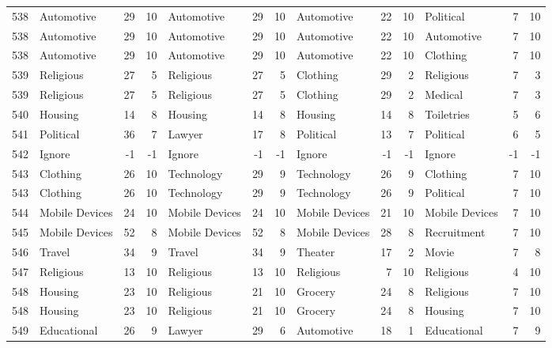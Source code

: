 \begin{figure}[htbp]
\begin{tabular}{rlrrlrrlrrlrr}
    538   & Automotive & 29    & 10    & Automotive & 29    & 10    & Automotive & 22    & 10    & Political & 7     & 10 \\
    538   & Automotive & 29    & 10    & Automotive & 29    & 10    & Automotive & 22    & 10    & Automotive & 7     & 10 \\
    538   & Automotive & 29    & 10    & Automotive & 29    & 10    & Automotive & 22    & 10    & Clothing & 7     & 10 \\
    539   & Religious & 27    & 5     & Religious & 27    & 5     & Clothing & 29    & 2     & Religious & 7     & 3 \\
    539   & Religious & 27    & 5     & Religious & 27    & 5     & Clothing & 29    & 2     & Medical & 7     & 3 \\
    540   & Housing & 14    & 8     & Housing & 14    & 8     & Housing & 14    & 8     & Toiletries & 5     & 6 \\
    541   & Political & 36    & 7     & Lawyer & 17    & 8     & Political & 13    & 7     & Political & 6     & 5 \\
    542   & Ignore & -1    & -1    & Ignore & -1    & -1    & Ignore & -1    & -1    & Ignore & -1    & -1 \\
    543   & Clothing & 26    & 10    & Technology & 29    & 9     & Technology & 26    & 9     & Clothing & 7     & 10 \\
    543   & Clothing & 26    & 10    & Technology & 29    & 9     & Technology & 26    & 9     & Political & 7     & 10 \\
    544   & Mobile Devices & 24    & 10    & Mobile Devices & 24    & 10    & Mobile Devices & 21    & 10    & Mobile Devices & 7     & 10 \\
    545   & Mobile Devices & 52    & 8     & Mobile Devices & 52    & 8     & Mobile Devices & 28    & 8     & Recruitment & 7     & 10 \\
    546   & Travel & 34    & 9     & Travel & 34    & 9     & Theater & 17    & 2     & Movie & 7     & 8 \\
    547   & Religious & 13    & 10    & Religious & 13    & 10    & Religious & 7     & 10    & Religious & 4     & 10 \\
    548   & Housing & 23    & 10    & Religious & 21    & 10    & Grocery & 24    & 8     & Religious & 7     & 10 \\
    548   & Housing & 23    & 10    & Religious & 21    & 10    & Grocery & 24    & 8     & Housing & 7     & 10 \\
    549   & Educational & 26    & 9     & Lawyer & 29    & 6     & Automotive & 18    & 1     & Educational & 7     & 9 \\

\end{tabular}
\end{figure}
